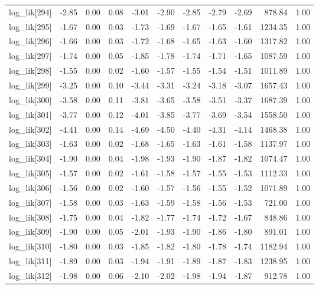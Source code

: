 \begin{table}[ht]
\begin{tabular}{rrrrrrrrrrr}
  log\_lik[294] & -2.85 & 0.00 & 0.08 & -3.01 & -2.90 & -2.85 & -2.79 & -2.69 & 878.84 & 1.00 \\ 
  log\_lik[295] & -1.67 & 0.00 & 0.03 & -1.73 & -1.69 & -1.67 & -1.65 & -1.61 & 1234.35 & 1.00 \\ 
  log\_lik[296] & -1.66 & 0.00 & 0.03 & -1.72 & -1.68 & -1.65 & -1.63 & -1.60 & 1317.82 & 1.00 \\ 
  log\_lik[297] & -1.74 & 0.00 & 0.05 & -1.85 & -1.78 & -1.74 & -1.71 & -1.65 & 1087.59 & 1.00 \\ 
  log\_lik[298] & -1.55 & 0.00 & 0.02 & -1.60 & -1.57 & -1.55 & -1.54 & -1.51 & 1011.89 & 1.00 \\ 
  log\_lik[299] & -3.25 & 0.00 & 0.10 & -3.44 & -3.31 & -3.24 & -3.18 & -3.07 & 1657.43 & 1.00 \\ 
  log\_lik[300] & -3.58 & 0.00 & 0.11 & -3.81 & -3.65 & -3.58 & -3.51 & -3.37 & 1687.39 & 1.00 \\ 
  log\_lik[301] & -3.77 & 0.00 & 0.12 & -4.01 & -3.85 & -3.77 & -3.69 & -3.54 & 1558.50 & 1.00 \\ 
  log\_lik[302] & -4.41 & 0.00 & 0.14 & -4.69 & -4.50 & -4.40 & -4.31 & -4.14 & 1468.38 & 1.00 \\ 
  log\_lik[303] & -1.63 & 0.00 & 0.02 & -1.68 & -1.65 & -1.63 & -1.61 & -1.58 & 1137.97 & 1.00 \\ 
  log\_lik[304] & -1.90 & 0.00 & 0.04 & -1.98 & -1.93 & -1.90 & -1.87 & -1.82 & 1074.47 & 1.00 \\ 
  log\_lik[305] & -1.57 & 0.00 & 0.02 & -1.61 & -1.58 & -1.57 & -1.55 & -1.53 & 1112.33 & 1.00 \\ 
  log\_lik[306] & -1.56 & 0.00 & 0.02 & -1.60 & -1.57 & -1.56 & -1.55 & -1.52 & 1071.89 & 1.00 \\ 
  log\_lik[307] & -1.58 & 0.00 & 0.03 & -1.63 & -1.59 & -1.58 & -1.56 & -1.53 & 721.00 & 1.00 \\ 
  log\_lik[308] & -1.75 & 0.00 & 0.04 & -1.82 & -1.77 & -1.74 & -1.72 & -1.67 & 848.86 & 1.00 \\ 
  log\_lik[309] & -1.90 & 0.00 & 0.05 & -2.01 & -1.93 & -1.90 & -1.86 & -1.80 & 891.01 & 1.00 \\ 
  log\_lik[310] & -1.80 & 0.00 & 0.03 & -1.85 & -1.82 & -1.80 & -1.78 & -1.74 & 1182.94 & 1.00 \\ 
  log\_lik[311] & -1.89 & 0.00 & 0.03 & -1.94 & -1.91 & -1.89 & -1.87 & -1.83 & 1238.95 & 1.00 \\ 
  log\_lik[312] & -1.98 & 0.00 & 0.06 & -2.10 & -2.02 & -1.98 & -1.94 & -1.87 & 912.78 & 1.00 \\ 

\end{tabular}
\end{table}

